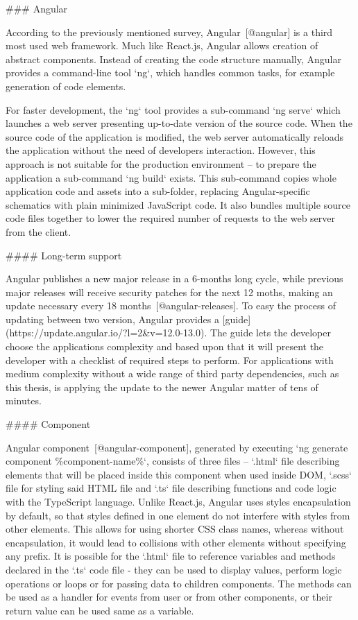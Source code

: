 \documentclass[
  digital, %
  oneside, %
  lof,     %
  lot,     %
]{fithesis4}
\begin{document}
{### Angular

According to the previously mentioned survey, Angular~[@angular] is a third most used web framework. Much like React.js, Angular allows creation of abstract components. Instead of creating the code structure manually, Angular provides a command-line tool `ng`, which handles common tasks, for example generation of code elements.

For faster development, the `ng` tool provides a sub-command `ng serve` which launches a web server presenting up-to-date version of the source code. When the source code of the application is modified, the web server automatically reloads the application without the need of developers interaction. However, this approach is not suitable for the production environment -- to prepare the application a sub-command `ng build` exists. This sub-command copies whole application code and assets into a sub-folder, replacing Angular-specific schematics with plain minimized JavaScript code. It also bundles multiple source code files together to lower the required number of requests to the web server from the client.

#### Long-term support

Angular publishes a new major release in a 6-months long cycle, while previous major releases will receive security patches for the next 12 moths, making an update necessary every 18 months~[@angular-releases]. To easy the process of updating between two version, Angular provides a [guide](https://update.angular.io/?l=2&v=12.0-13.0). The guide lets the developer choose the applications complexity and based upon that it will present the developer with a checklist of required steps to perform. For applications with medium complexity without a wide range of third party dependencies, such as this thesis, is applying the update to the newer Angular matter of tens of minutes.

#### Component

Angular component~[@angular-component], generated by executing `ng generate component \%component-name\%`, consists of three files -- `.html` file describing elements that will be placed inside this component when used inside DOM, `.scss` file for styling said HTML file and `.ts` file describing functions and code logic with the TypeScript language. Unlike React.js, Angular uses styles encapsulation by default, so that styles defined in one element do not interfere with styles from other elements. This allows for using shorter CSS class names, whereas without encapsulation, it would lead to collisions with other elements without specifying any prefix. It is possible for the `.html` file to reference variables and methods declared in the `.ts` code file - they can be used to display values, perform logic operations or loops or for passing data to children components. The methods can be used as a handler for events from user or from other components, or their return value can be used same as a variable.

}
\end{document}
